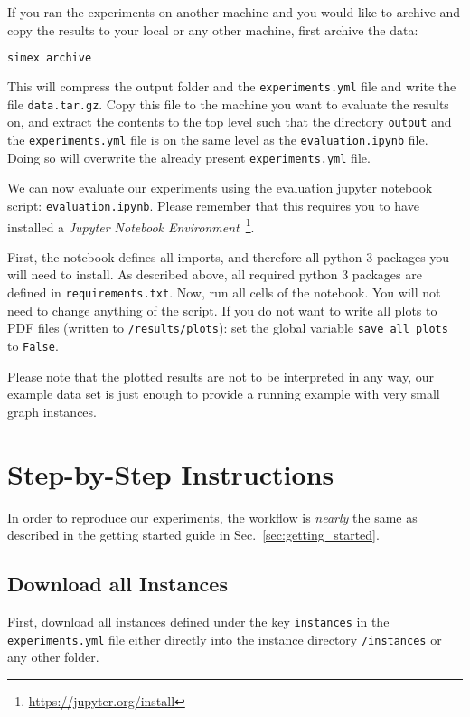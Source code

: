 \documentclass[11pt, a4paper]{scrartcl}
\newcommand{\expfile}{\texttt{experiments.yml} file\xspace}
\begin{document}
If you ran the experiments on another machine and you would like to archive and
copy the results to your local or any other machine, first archive the data:

\begin{lstlisting}[language=bash]
simex archive
\end{lstlisting}

This will compress the output folder and the \expfile and write the file
\texttt{data.tar.gz}. Copy this file to the machine you want to evaluate the
results on, and extract the contents to the top level such that the directory
\texttt{output} and the \expfile is on the same level as the
\texttt{evaluation.ipynb} file. Doing so will overwrite the already present
\expfile.

We can now evaluate our experiments using the evaluation jupyter notebook
script: \texttt{evaluation.ipynb}. Please remember that this requires you to
have installed a \emph{Jupyter Notebook
Environment}~\footnote{\url{https://jupyter.org/install}}.

First, the notebook defines all imports, and therefore all python 3 packages you
will need to install. As described above, all required python 3 packages are
defined in \texttt{requirements.txt}. Now, run all cells of the notebook. You
will not need to change anything of the script. If you do not want to write all
plots to PDF files (written to \texttt{/results/plots}): set the global variable
\texttt{save\_all\_plots} to \texttt{False}.

Please note that the plotted results are not to be interpreted in any way, our
example data set is just enough to provide a running example with very small
graph instances.

\section{Step-by-Step Instructions}\label{sec:step_by_step}

In order to reproduce our experiments, the workflow is \emph{nearly} the same as
described in the getting started guide in Sec.~\ref{sec:getting_started}.

\subsection{Download all Instances}

First, download all instances defined under the key \texttt{instances} in the
\expfile either directly into the instance directory \texttt{/instances} or any
other folder.
\end{document}
